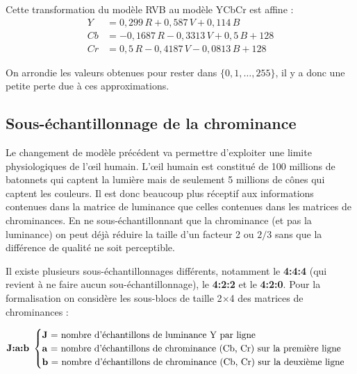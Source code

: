 \documentclass{article}
\begin{document}
\vspace{0.6cm}

Cette transformation du modèle RVB au modèle YCbCr est affine : 
\begin{align*}
    Y &= 0,299 \, R + 0,587 \, V + 0,114 \, B \\
    Cb &= -0,1687 \, R - 0,3313 \, V + 0,5 \, B + 128 \\
    Cr &= 0,5 \, R - 0,4187 \, V - 0,0813 \, B + 128
\end{align*}

On arrondie les valeurs obtenues pour rester dans $\{0, 1, \ldots, 255\}$, il y a donc une petite perte due à ces approximations.

\subsection{Sous-échantillonnage de la chrominance}

Le changement de modèle précédent va permettre d'exploiter une limite physiologiques de l’œil humain. L’œil humain est constitué de 100 millions de batonnets qui captent la lumière mais de seulement 5 millions de cônes qui captent les couleurs. Il est donc beaucoup plus réceptif aux informations contenues dans la matrice de luminance que celles contenues dans les matrices de chrominances. En ne sous-échantillonnant que la chrominance (et pas la luminance) on peut déjà réduire la taille d'un facteur 2 ou $2/3$ sans que la différence de qualité ne soit perceptible.

\vspace{.4cm}

Il existe plusieurs sous-échantillonnages différents, notamment le \textbf{4:4:4} (qui revient à ne faire aucun sou-échantillonnage), le \textbf{4:2:2} et le \textbf{4:2:0}. Pour la formalisation on considère les sous-blocs de taille 2$\times$4 des matrices de chrominances :

\vspace{0.3cm}
\[
    \textbf{J:a:b} \ 
    \begin{cases}
    \text{\textbf{J} = nombre d'échantillons de luminance Y par ligne} \\
    \text{\textbf{a} = nombre d'échantillons de chrominance (Cb, Cr) sur la première ligne} \\
    \text{\textbf{b} = nombre d'échantillons de chrominance (Cb, Cr) sur la deuxième ligne} \\        
    \end{cases}
\]
\end{document}
